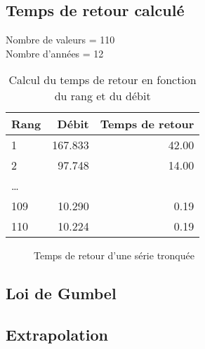 \subsection{Temps de retour calculé}
Nombre de valeurs = 110 \\
Nombre d'années = 12
\begin{table}[H]
    \centering
    \begin{tabular}{l|r|r}
        \toprule
        \textbf{Rang} & \textbf{Débit} & \textbf{Temps de retour} \\
        \midrule
        1             & 167.833        & 42.00                    \\
        2             & 97.748         & 14.00                    \\
        \dots         &                &                          \\
        109           & 10.290         & 0.19                     \\
        110           & 10.224         & 0.19                     \\
        \bottomrule
    \end{tabular}
    \caption{Calcul du temps de retour en fonction du rang et du débit}
    \label{tab:serieTronquee_tempsRetour}
\end{table}
\begin{figure}[H]
    \centering
    \resizebox*{0.45\textwidth}{!}{
        
    }
    \caption{Temps de retour d'une série tronquée}
    \label{graph:tempsRetour_serieTronquee}
\end{figure}

\subsection{Loi de Gumbel}
\subsection{Extrapolation}